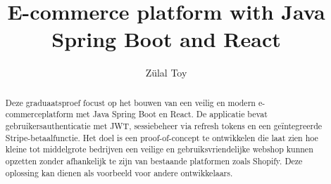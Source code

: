 \documentclass[a0,portrait]{hogent-poster}
\title{E-commerce platform with Java Spring Boot and React}
\author{Zülal Toy}
\begin{document}
\maketitle

\begin{abstract}
Deze graduaatsproef focust op het bouwen van een veilig en modern e-commerceplatform met Java Spring Boot en React. De applicatie bevat gebruikersauthenticatie met JWT, sessiebeheer via refresh tokens en een geïntegreerde Stripe-betaalfunctie. Het doel is een proof-of-concept te ontwikkelen die laat zien hoe kleine tot middelgrote bedrijven een veilige en gebruiksvriendelijke webshop kunnen opzetten zonder afhankelijk te zijn van bestaande platformen zoals Shopify. Deze oplossing kan dienen als voorbeeld voor andere ontwikkelaars.
\end{abstract}
\end{document}
